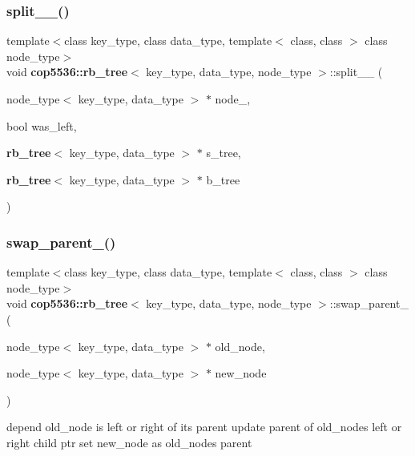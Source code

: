 \subsubsection{split\_\_()}
{\footnotesize\ttfamily template$<$class key\+\_\+type, class data\+\_\+type, template$<$ class, class $>$ class node\+\_\+type$>$ \\
void \textbf{ cop5536\+::rb\+\_\+tree}$<$ key\+\_\+type, data\+\_\+type, node\+\_\+type $>$\+::split\+\_\+\+\_\+ (\begin{DoxyParamCaption}\item[{node\+\_\+type$<$ key\+\_\+type, data\+\_\+type $>$ $\ast$}]{node\+\_\+,  }\item[{bool}]{was\+\_\+left,  }\item[{\textbf{ rb\+\_\+tree}$<$ key\+\_\+type, data\+\_\+type $>$ $\ast$}]{s\+\_\+tree,  }\item[{\textbf{ rb\+\_\+tree}$<$ key\+\_\+type, data\+\_\+type $>$ $\ast$}]{b\+\_\+tree }\end{DoxyParamCaption})\hspace{0.3cm}{\ttfamily [inline]}}

\mbox{\label{classcop5536_1_1rb__tree_a49391ca4153c66bb83f6d59e191dfdeb}} 
\subsubsection{swap\_parent\_()}
{\footnotesize\ttfamily template$<$class key\+\_\+type, class data\+\_\+type, template$<$ class, class $>$ class node\+\_\+type$>$ \\
void \textbf{ cop5536\+::rb\+\_\+tree}$<$ key\+\_\+type, data\+\_\+type, node\+\_\+type $>$\+::swap\+\_\+parent\+\_\+ (\begin{DoxyParamCaption}\item[{node\+\_\+type$<$ key\+\_\+type, data\+\_\+type $>$ $\ast$}]{old\+\_\+node,  }\item[{node\+\_\+type$<$ key\+\_\+type, data\+\_\+type $>$ $\ast$}]{new\+\_\+node }\end{DoxyParamCaption})\hspace{0.3cm}{\ttfamily [inline]}}

depend old\+\_\+node is left or right of its parent update parent of old\+\_\+node\textquotesingle{}s left or right child ptr set new\+\_\+node as old\+\_\+node\textquotesingle{}s parent \mbox{\label{classcop5536_1_1rb__tree_ab1d05dae701473136ce4db4592c1659d}} 
